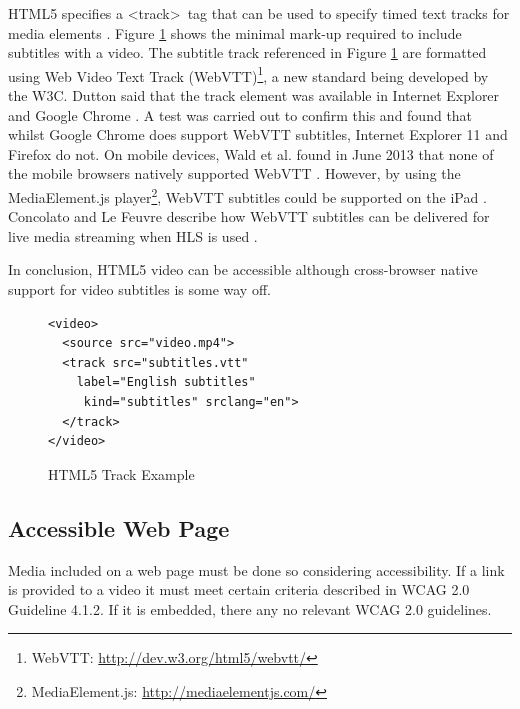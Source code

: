 \documentclass[journal]{IEEEtran}
\begin{document}
HTML5 specifies a \textless track\textgreater~tag that can be used to specify timed text tracks for media elements \cite{standard:html5}. Figure \ref{lst:trackExample} shows the minimal mark-up required to include subtitles with a video. The subtitle track referenced in Figure \ref{lst:trackExample} are formatted using Web Video Text Track (WebVTT)\footnote{WebVTT: \url{http://dev.w3.org/html5/webvtt/}}, a new standard being developed by the W3C. Dutton said that the track element was available in Internet Explorer and Google Chrome \cite{we
bsite:html5RocksTrackElement}. A test was carried out to confirm this and found that whilst Google Chrome does support WebVTT subtitles, Internet Explorer 11 and Firefox do not. On mobile devices, Wald et al. found in June 2013 that none of the mobile browsers natively supported WebVTT \cite{article:synote}. However, by using the MediaElement.js player\footnote{MediaElement.js: \url{http://mediaelementjs.com/}}, WebVTT subtitles could be supported on the iPad \cite{article:synote}. Concolato and Le Feuvre describe how WebVTT subtitles can be delivered for live media streaming when HLS is used \cite{inproceedings:liveHTTPSubtitle}.

In conclusion, HTML5 video can be accessible although cross-browser native support for video subtitles is some way off.

\begin{figure}
\label{lst:trackExample}
\caption{HTML5 Track Example \cite{website:html5RocksTrackElement}}
\begin{lstlisting}[frame=single,language=HTML5]
<video>
  <source src="video.mp4">
  <track src="subtitles.vtt"
    label="English subtitles"
     kind="subtitles" srclang="en">
  </track>
</video>
\end{lstlisting}
\end{figure}


\subsection{Accessible Web Page}
Media included on a web page must be done so considering accessibility. If a link is provided to a video it must meet certain criteria described in WCAG 2.0 Guideline 4.1.2. If it is embedded, there any no relevant WCAG 2.0 guidelines.
\end{document}
